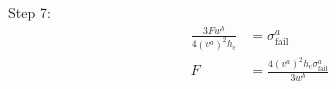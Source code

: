 Step 7:
\begin{align*}
	\frac{ 3 F w^b }{ 4 \left( v^a \right)^2 h_\text{c} } &= \sigma^a_\text{fail} \\
	F &= \frac{ 4 \left( v^a \right)^2 h_\text{c} \sigma^a_\text{fail} }{ 3 w^b } \\

\end{align*}
